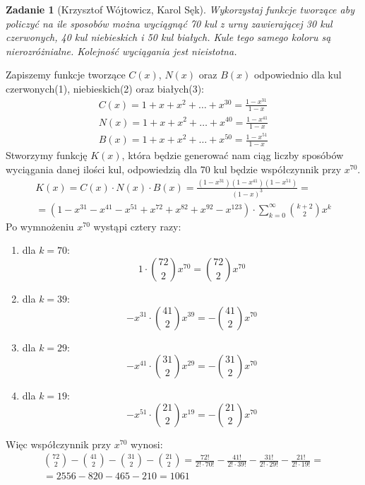 \documentclass{mwart}
\newtheorem{zad}{Zadanie}[section]
\begin{document}
\begin{zad}[Krzysztof Wójtowicz, Karol Sęk]
    Wykorzystaj funkcje tworzące aby policzyć na ile sposobów można wyciągnąć 70 kul z urny zawierającej 30 kul czerwonych, 40 kul niebieskich i 50 kul białych. Kule tego samego koloru są nierozróżnialne. Kolejność wyciągania jest nieistotna.
\end{zad}
\begin{mdframed}
    Zapiszemy funkcje tworzące $C(x)$, $N(x)$ oraz $B(x)$ odpowiednio dla kul czerwonych(1), niebieskich(2) oraz białych(3):
    \begin{align}
        C(x) = 1 + x + x^2 + \dots + x^{30} = \frac{1 - x^{31}}{1 - x} \\
        N(x) = 1 + x + x^2 + \dots + x^{40} = \frac{1 - x^{41}}{1 - x} \\
        B(x) = 1 + x + x^2 + \dots + x^{50} = \frac{1 - x^{51}}{1 - x}
    \end{align}
    Stworzymy funkcję $K(x)$, która będzie generować nam ciąg liczby sposóbów wyciągania danej ilości kul, odpowiedzią dla 70 kul będzie współczynnik przy $x^{70}$.
    \begin{gather*}
        K(x) = C(x) \cdot N(x) \cdot B(x) = \frac{(1 - x^{31})(1 - x^{41})(1 - x^{51})}{(1 - x)^3} = \\
        = (1 - x^{31} - x^{41} - x^{51} + x^{72} + x^{82} + x^{92} - x^{123}) \cdot \sum_{k=0}^{\infty} \binom{k+2}{2}x^k
    \end{gather*}
    Po wymnożeniu $x^{70}$ wystąpi cztery razy:
    \begin{enumerate}
        \item dla $k = 70$: \[ 1 \cdot \binom{72}{2}x^{70} = \binom{72}{2}x^{70}\]
        \item dla $k = 39$: \[ -x^{31} \cdot \binom{41}{2}x^{39} = -\binom{41}{2}x^{70}\]
        \item dla $k = 29$: \[ -x^{41} \cdot \binom{31}{2}x^{29} = -\binom{31}{2}x^{70}\]
        \item dla $k = 19$: \[ -x^{51} \cdot \binom{21}{2}x^{19} = -\binom{21}{2}x^{70}\]
    \end{enumerate}
    Więc współczynnik przy $x^{70}$ wynosi:
    \begin{gather*}
        \binom{72}{2} - \binom{41}{2} - \binom{31}{2} - \binom{21}{2} = \frac{72!}{2! \cdot 70!} - \frac{41!}{2! \cdot 39!} - \frac{31!}{2! \cdot 29!} - \frac{21!}{2! \cdot 19!} = \\ = 2556 - 820 - 465 - 210 = 1061
    \end{gather*}

\end{mdframed}
\end{document}
